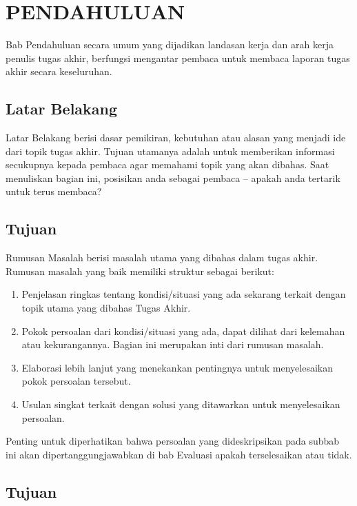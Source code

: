 \documentclass[../index.tex]{subfiles}
\begin{document}
\chapter{PENDAHULUAN}
\setcounter{page}{1}

Bab Pendahuluan secara umum yang dijadikan landasan kerja dan arah kerja penulis tugas akhir, berfungsi mengantar pembaca untuk membaca laporan tugas akhir secara keseluruhan.

\section{Latar Belakang}

Latar Belakang berisi dasar pemikiran, kebutuhan atau alasan yang menjadi ide dari topik tugas akhir. Tujuan utamanya adalah untuk memberikan informasi secukupnya kepada pembaca agar memahami topik yang akan dibahas.  Saat menuliskan bagian ini, posisikan anda sebagai pembaca – apakah anda tertarik untuk terus membaca?

\section{Tujuan}

Rumusan Masalah berisi masalah utama yang dibahas dalam tugas akhir. Rumusan masalah yang baik memiliki struktur sebagai berikut:

\begin{enumerate}
	\item Penjelasan ringkas tentang kondisi/situasi yang ada sekarang terkait dengan topik utama yang dibahas Tugas Akhir.
	\item Pokok persoalan dari kondisi/situasi yang ada, dapat dilihat dari kelemahan atau kekurangannya. Bagian ini merupakan inti dari rumusan masalah.
	\item Elaborasi lebih lanjut yang menekankan pentingnya untuk menyelesaikan pokok persoalan tersebut.
	\item Usulan singkat terkait dengan solusi yang ditawarkan untuk menyelesaikan persoalan.
\end{enumerate}

Penting untuk diperhatikan bahwa persoalan yang dideskripsikan pada subbab ini akan dipertanggungjawabkan di bab Evaluasi apakah terselesaikan atau tidak.

\section{Tujuan}
\end{document}
